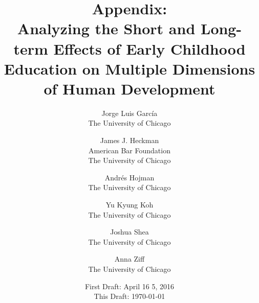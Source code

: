 




\title{\Large \textbf{Appendix: \\ Analyzing the Short and Long-term Effects of Early Childhood Education on Multiple Dimensions of Human Development}}

\author{
Jorge Luis Garc\'{i}a\\
The University of Chicago \and
James J. Heckman \\
American Bar Foundation \\
The University of Chicago \and
Andr\'{e}s Hojman\\
The University of Chicago \and
Yu Kyung Koh \\ 
The University of Chicago \and
Joshua Shea \\
The University of Chicago \and
Anna Ziff \\ 
The University of Chicago}
\date{First Draft: April 16 5, 2016\\ This Draft: \today}
\maketitle

\singlespacing
\pagebreak
\tableofcontents
\listoffigures
\listoftables
\pagebreak


